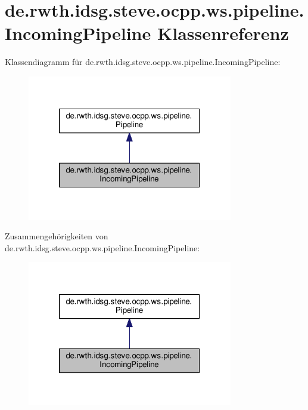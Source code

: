 \hypertarget{classde_1_1rwth_1_1idsg_1_1steve_1_1ocpp_1_1ws_1_1pipeline_1_1_incoming_pipeline}{\section{de.\-rwth.\-idsg.\-steve.\-ocpp.\-ws.\-pipeline.\-Incoming\-Pipeline Klassenreferenz}
\label{classde_1_1rwth_1_1idsg_1_1steve_1_1ocpp_1_1ws_1_1pipeline_1_1_incoming_pipeline}
}


Klassendiagramm für de.\-rwth.\-idsg.\-steve.\-ocpp.\-ws.\-pipeline.\-Incoming\-Pipeline\-:\nopagebreak
\begin{figure}[H]
\begin{center}
\leavevmode
\includegraphics[width=254pt]{classde_1_1rwth_1_1idsg_1_1steve_1_1ocpp_1_1ws_1_1pipeline_1_1_incoming_pipeline__inherit__graph}
\end{center}
\end{figure}


Zusammengehörigkeiten von de.\-rwth.\-idsg.\-steve.\-ocpp.\-ws.\-pipeline.\-Incoming\-Pipeline\-:\nopagebreak
\begin{figure}[H]
\begin{center}
\leavevmode
\includegraphics[width=254pt]{classde_1_1rwth_1_1idsg_1_1steve_1_1ocpp_1_1ws_1_1pipeline_1_1_incoming_pipeline__coll__graph}
\end{center}
\end{figure}
